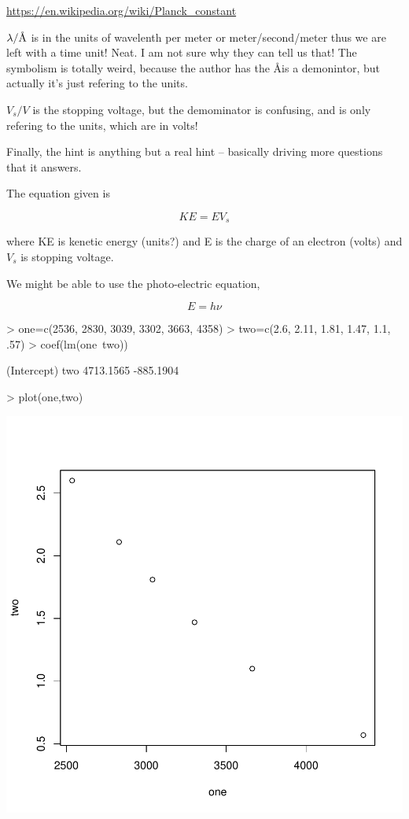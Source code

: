 \documentclass{article}
\newcommand{\angstrom}{\textup{\AA}}
\begin{document}
\url{https://en.wikipedia.org/wiki/Planck_constant}



$\lambda/\angstrom$ is in the units of wavelenth per meter or meter/second/meter thus we are left with a time unit! Neat. I am not sure why they can tell us that!  The symbolism is totally weird, because the author has the \angstrom is a demonintor, but actually it's just refering to the units. 

$V_s/V$ is the stopping voltage, but the demominator is confusing, and is only refering to the units, which are in volts!

Finally, the hint is anything but a real hint -- basically driving more questions that it answers. 

The equation given is 

\begin{equation}
KE = EV_s
\end{equation}

\noindent where KE is kenetic energy (units?) and E is the charge of an electron (volts) and $V_s$ is stopping voltage.

We might be able to use the photo-electric equation,

\begin{equation}
E = h\nu
\end{equation}

\begin{Schunk}
\begin{Sinput}
> one=c(2536, 2830, 3039, 3302, 3663, 4358)
> two=c(2.6, 2.11, 1.81, 1.47, 1.1, .57)
> coef(lm(one~two))
\end{Sinput}
\begin{Soutput}
(Intercept)         two 
  4713.1565   -885.1904 
\end{Soutput}
\begin{Sinput}
> plot(one,two)
\end{Sinput}
\end{Schunk}
\includegraphics{Chemistry1-003}
\end{document}

